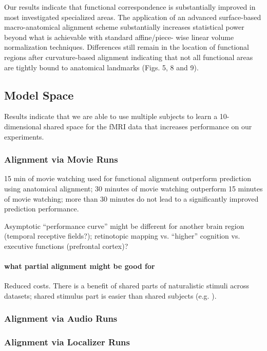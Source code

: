 %
Our results indicate that functional correspondence is substantially improved in
most investigated specialized areas.
%
The application of an advanced surface-based macro-anatomical alignment scheme
substantially increases statistical power beyond what is achievable with
standard affine/piece- wise linear volume normalization techniques.
%
Differences still remain in the location of functional regions after
curvature-based alignment indicating that not all functional areas are tightly
bound to anatomical landmarks (Figs. 5, 8 and 9).


\subsection{Model Space}
%
Results indicate that we are able to use multiple subjects to learn a
10-dimensional shared space for the fMRI data that increases performance on our
experiments.


\subsubsection{Alignment via Movie Runs}

%
15 min of movie watching used for functional alignment outperform prediction
using anatomical alignment;
%
30 minutes of movie watching outperform 15 minutes of movie watching;
%
more than 30 minutes do not lead to a significantly improved prediction
performance.

%
Asymptotic ``performance curve'' might be different for another brain region
(temporal receptive fields?); retinotopic mapping vs. ``higher'' cognition  vs.
executive functions (prefrontal cortex)?


\paragraph{what partial alignment might be good for}
%
Reduced costs.
%
There is a benefit of shared parts of naturalistic stimuli across datasets;
shared stimulus part is easier than shared subjects (e.g.
\citep{zhang2018transfer}).


\subsubsection{Alignment via Audio Runs}


\subsubsection{Alignment via Localizer Runs}

